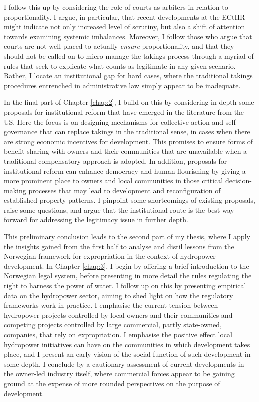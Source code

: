 \documentclass{article} %
\begin{document}
I follow this up by considering the role of courts as arbiters in relation to proportionality. I argue, in particular, that recent developments at the ECtHR might indicate not only increased level of scrutiny, but also a shift of attention towards examining systemic imbalances. Moreover, I follow those who argue that courts are not well placed to actually {\it ensure} proportionality, and that they should not be called on to micro-manage the takings process through a myriad of rules that seek to explicate what counts as legitimate in any given scenario. Rather, I locate an institutional gap for hard cases, where the traditional takings procedures entrenched in administrative law simply appear to be inadequate.

In the final part of Chapter \ref{chap:2}, I build on this by considering in depth some proposals for institutional reform that have emerged in the literature from the US. Here the focus is on designing mechanisms for collective action and self-governance that can replace takings in the traditional sense, in cases when there are strong economic incentives for development. This promises to ensure forms of benefit sharing with owners and their communities that are unavailable when a traditional compensatory approach is adopted. In addition, proposals for institutional reform can enhance democracy and human flourishing by giving a more prominent place to owners and local communities in those critical decision-making processes that may lead to development and reconfiguration of established property patterns. I pinpoint some shortcomings of existing proposals, raise some questions, and argue that the institutional route is the best way forward for addressing the legitimacy issue in further depth.

This preliminary conclusion leads to the second part of my thesis, where I apply the insights gained from the first half to analyse and distil lessons from the Norwegian framework for expropriation in the context of hydropower development. In Chapter \ref{chap:3}, I begin by offering a brief introduction to the Norwegian legal system, before presenting in more detail the rules regulating the right to harness the power of water. I follow up on this by presenting empirical data on the hydropower sector, aiming to shed light on how the regulatory frameworks work in practice. I emphasise the current tension between hydropower projects controlled by local owners and their communities and competing projects controlled by large commercial, partly state-owned, companies, that rely on expropriation. I emphasise the positive effect local hydropower initiatives can have on the communities in which development takes place, and I present an early vision of the social function of such development in some depth. I conclude by a cautionary assessment of current developments in the owner-led industry itself, where commercial forces appear to be gaining ground at the expense of more rounded perspectives on the purpose of development.
\end{document}
